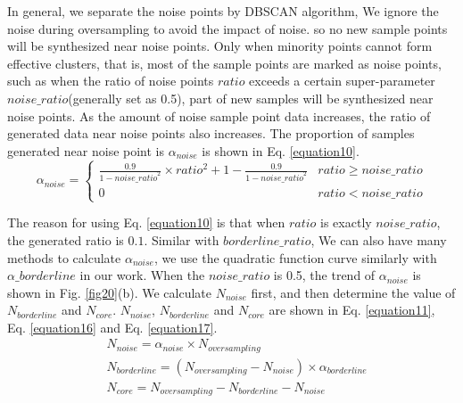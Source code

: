 \documentclass[ida]{iosart2x}
\begin{document}
In general, 
we separate the noise points by DBSCAN algorithm,
We ignore the noise during oversampling to avoid the impact of noise.
so no new sample points will be synthesized near noise points.
Only when minority points cannot form effective clusters, that is,
most of the sample points are marked as noise points, 
such as when the ratio of noise points $ratio$ exceeds a certain 
super-parameter $noise\_ratio$(generally set as 0.5),
part of new samples will be synthesized near noise points.
As the amount of noise sample point data increases, 
the ratio of generated data near noise points also increases. 
The proportion of samples generated near noise point
 is $\alpha_{noise}$ is shown in Eq. \ref{equation10}.
\begin{equation}
  \label{equation10}
  \alpha_{noise}=
  \begin{cases}
  \frac{0.9}{1-{noise\_{ratio}}^2}\times ratio^2+1-\frac{0.9}{1-{noise\_ratio}^2} & ratio \ge noise\_ratio\\
  0                                                                               & ratio < noise\_ratio
  \end{cases}
\end{equation}

The reason for using Eq. \ref{equation10} is that when $ratio$ is exactly
$noise\_ratio$, the generated ratio is $0.1$. Similar with $borderline\_ratio$,
We can also have many methods to calculate $\alpha_{noise}$,
we use the quadratic function curve similarly with $\alpha\_borderline$ in our work.
When the $noise\_ratio$ is 0.5, the trend of $\alpha_{noise}$ is shown in Fig. \ref{fig20}(b).
We calculate $N_{noise}$ first, and then determine the value of $N_{borderline}$ and $N_{core}$.
$N_{noise}$, $N_{borderline}$ 
and $N_{core}$ are shown in Eq. \ref{equation11}, Eq. \ref{equation16}
and Eq. \ref{equation17}.
\begin{align}
  \label{equation11} & N_{noise}=\alpha_{noise} \times N_{oversampling} \\
  \label{equation16} & N_{borderline}=(N_{oversampling}-N_{noise})\times \alpha_{borderline}\\
  \label{equation17} & N_{core}=N_{oversampling}-N_{borderline}-N_{noise}
\end{align}
\end{document}
